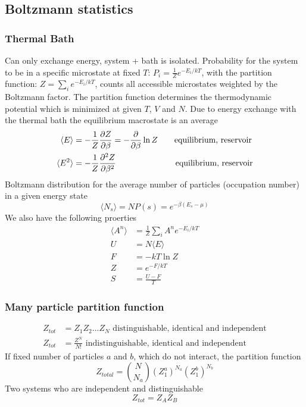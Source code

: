 \documentclass[a4paper, norsk, 8pt]{article}
\begin{document}
\begin{multicols*}{3}
\subsection*{\footnotesize  Boltzmann statistics}
\subsubsection*{\scriptsize Thermal Bath}
Can only exchange energy, system + bath is isolated. Probability for the system to be in a specific microstate at fixed $T$: $P_i = \frac{1}{Z}e^{-E_i/kT}$, with the partition function: $Z = \sum_{i} e^{-E_i/kT}$, counts all accessible microstates weighted by the Boltzmann factor. The partition function determines the thermodynamic potential which is minimized at given $T$, $V$ and $N$. Due to energy exchange with the thermal bath the equilibrium macrostate is an average
\begin{align*}
  \langle E \rangle &= -\frac{1}{Z}\pdv{Z}{\beta}  = -\pdv{}{\beta}\ln{Z}\qquad \text{equilibrium, reservoir}\\
  \langle E^2 \rangle &= -\frac{1}{Z}\pdv[2]{Z}{\beta}\quad \qquad \qquad \qquad \,\text{equilibrium, reservoir}
\end{align*}
Boltzmann distribution for the average number of particles (occupation number) in a given energy state
\begin{equation*}
  \langle N_s \rangle = NP(s) = e^{-\beta(E_s-\mu)}
\end{equation*}
We also have the following proerties
\begin{align*}
    \langle A^n \rangle &= \frac{1}{Z}\sum_{i} A^n e^{-E_i/kT} \\
    U &= N\langle E \rangle  \\
    F &= -kT\ln{Z} \\
    Z &= e^{-F/kT} \\
    S &= \frac{U-F}{T}
\end{align*}
\subsubsection*{\scriptsize Many particle partition function}
\begin{align*}
  Z_{tot} &= Z_1Z_2...Z_N\,\, \text{distinguishable, identical and independent}\\
  Z_{tot} &= \frac{Z^N}{N!}\,\, \text{indistinguishable, identical and independent }
\end{align*}
If fixed number of particles $a$ and $b$, which do not interact, the partition function
\begin{equation*}
  Z_{total} = \binom{N}{N_a}(Z_1^a)^{N_a}(Z_1^b)^{N_b}
\end{equation*}
Two systems who are independent and distinguishable
$$Z_{tot} = Z_AZ_B $$

\end{multicols*}
\end{document}
